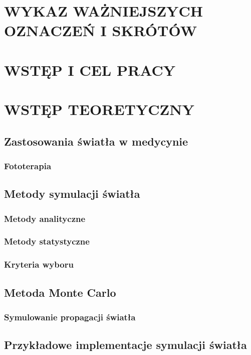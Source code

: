 \chapter{WYKAZ WAŻNIEJSZYCH OZNACZEŃ I SKRÓTÓW}
\label{chpt:wykaz-ważniejszych-oznaczeń-i-skrótów}



\chapter{WSTĘP I CEL PRACY}
\label{chpt:wstęp-i-cel-pracy}



\chapter{WSTĘP TEORETYCZNY}
\label{chpt:wstęp-teoretyczny}
\section{Zastosowania światła w medycynie}
\subsection{Fototerapia}
\section{Metody symulacji światła}
\subsection{Metody analityczne}
\subsection{Metody statystyczne}
\subsection{Kryteria wyboru}
\section{Metoda Monte Carlo}
\subsection{Symulowanie propagacji światła}
\section{Przykładowe implementacje symulacji światła}
